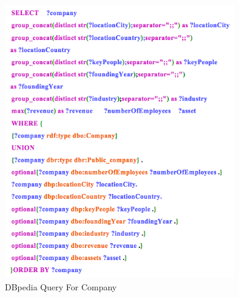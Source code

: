 \begin{figure}[H]
	\begin{center}
	\includegraphics[width=10cm]{DB_Com}
	\caption[DBpedia Query For Company]{DBpedia Query For Company}
	\label{fig:db}
	\end{center}
\end{figure}


